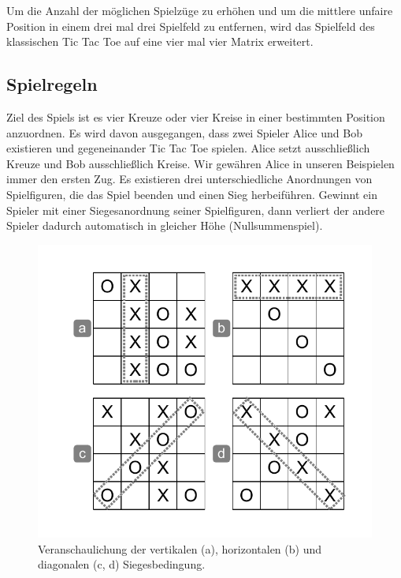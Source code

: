 Um die Anzahl der möglichen Spielzüge zu erhöhen und um die mittlere unfaire Position in einem drei mal drei Spielfeld zu entfernen, wird das Spielfeld des klassischen Tic Tac Toe auf eine vier mal vier Matrix erweitert.

\subsection{Spielregeln}
\label{subsec:Spielregeln}

Ziel des Spiels ist es vier Kreuze oder vier Kreise in einer bestimmten Position anzuordnen. Es wird davon ausgegangen, dass zwei Spieler Alice und Bob existieren und gegeneinander Tic Tac Toe spielen. Alice setzt ausschließlich Kreuze und Bob ausschließlich Kreise. Wir gewähren Alice in unseren Beispielen immer den ersten Zug. Es existieren drei unterschiedliche Anordnungen von Spielfiguren, die das Spiel beenden und einen Sieg herbeiführen. Gewinnt ein Spieler mit einer Siegesanordnung seiner Spielfiguren, dann verliert der andere Spieler dadurch automatisch in gleicher Höhe (Nullsummenspiel). \\

\begin{figure}[!htbp]
  \centering
  \includegraphics[scale = 1]{inhalt/abbildungen/siegesbedingungen_tictactoe.pdf}
  \caption{Veranschaulichung der vertikalen (a), horizontalen (b) und diagonalen (c, d) Siegesbedingung.}
  \label{fig:siegesbedingungen_tictactoe}
\end{figure}

